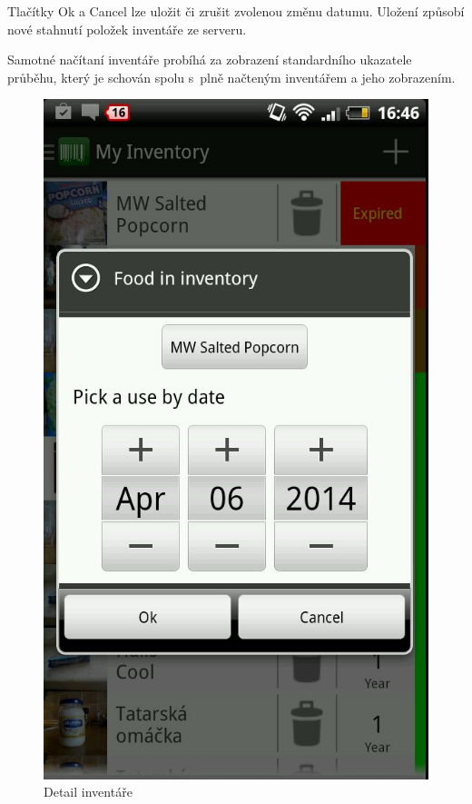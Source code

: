 \documentclass[thesis=B,czech]{FITthesis}[2013/10/20]
\begin{document}
Tlačítky Ok a Cancel lze uložit či zrušit zvolenou změnu datumu. Uložení způsobí nové stahnutí položek inventáře ze serveru.

Samotné načítaní inventáře probíhá za zobrazení standardního ukazatele průběhu, který je schován spolu s~plně načteným inventářem a jeho zobrazením.

\begin{figure}[H]
  \centering
  \includegraphics[scale=0.4]{screenshots/app_inventory_detail.jpg}
  \caption{Detail inventáře}
  \label{fig:AppInventoryDetail}
\end{figure}
\end{document}
